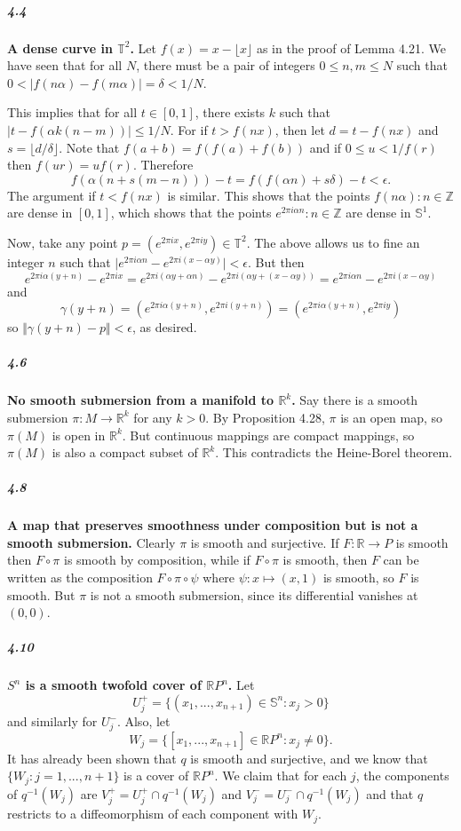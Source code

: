 \documentclass[10pt,letter]{article}
\begin{document}
\subparagraph{4.4} {\bf A dense curve in $\mathbb{T}^2$.} Let $f(x) = x - \lfloor x \rfloor$ as in the proof of Lemma 4.21. We have seen that for all $N$, there must be a pair of integers $0 \leq n,m \leq N$ such that $0 < \vert f(n\alpha) - f(m\alpha) \vert = \delta < 1/N$. 

This implies that for all $t \in [0,1]$, there exists $k$ such that $\vert t - f(\alpha k(n-m)) \vert \leq 1/N$. For if $t > f(nx)$, then let $d = t - f(nx)$ and $s = \lfloor d/\delta \rfloor$. Note that $f(a+b) = f(f(a)+f(b))$ and if $0 \leq u < 1/f(r)$ then $f(ur) = uf(r)$. Therefore
\[
f(\alpha(n + s(m-n))) - t = f(f(\alpha n) + s \delta) - t < \epsilon.
\]
The argument if $t < f(nx)$ is similar. This shows that the points $f(n\alpha): n \in \mathbb{Z}$ are dense in $[0,1]$, which shows that the points $e^{2 \pi i \alpha n}: n \in \mathbb{Z}$ are dense in $\mathbb{S}^1$.

Now, take any point $p = (e^{2 \pi i x},e^{2 \pi i y}) \in \mathbb{T}^2$. The above allows us to fine an integer $n$ such that $\vert e^{2 \pi i \alpha n} -  e^{2 \pi i (x-\alpha y)} \vert < \epsilon$. But then 
\[ e^{2\pi i \alpha(y+n)} - e^{2 \pi i x} = e^{2\pi i (\alpha y + \alpha n)} - e^{2 \pi i ( \alpha y +  (x- \alpha y))} = e^{2\pi i \alpha n} - e^{2 \pi i (x-\alpha y)}
\]
and  
\[
\gamma(y + n) = (e^{2 \pi i \alpha (y+n)}, e^{2 \pi i (y+n)}) = (e^{2 \pi i \alpha (y+n)}, e^{2 \pi i y})
\]
so $\Vert \gamma(y+n) - p \Vert < \epsilon$, as desired.


\subparagraph{4.6} {\bf No smooth submersion from a manifold to $\mathbb{R}^k$.} Say there is a smooth submersion $\pi: M \rightarrow \mathbb{R}^k$ for any $k > 0$. By Proposition 4.28, $\pi$ is an open map, so $\pi(M)$ is open in $\mathbb{R}^k$. But continuous mappings are compact mappings, so $\pi(M)$ is also a compact subset of $\mathbb{R}^k$. This contradicts the Heine-Borel theorem. 

\subparagraph{4.8} {\bf A map that preserves smoothness under composition but is not a smooth submersion.} Clearly $\pi$ is smooth and surjective. If $F: \mathbb{R} \rightarrow P$ is smooth then $F \circ \pi$ is smooth by composition, while if $F \circ \pi$ is smooth, then $F$ can be written as the composition $F \circ \pi \circ \psi$ where $\psi: x \mapsto (x,1)$ is smooth, so $F$ is smooth. But $\pi$ is not a smooth submersion, since its differential vanishes at $(0,0)$. 

\subparagraph{4.10} {\bf $S^n$ is a smooth twofold cover of $\mathbb{R}P^n$.}
Let 
\[ 
U_j^+ = \lbrace (x_1,...,x_{n+1}) \in \mathbb{S}^{n}: x_{j} > 0 \rbrace
\] 
and similarly for $U_j^-$. Also, let 
\[
W_j = \lbrace [x_1,...,x_{n+1}] \in \mathbb{R}P^n: x_j \neq 0 \rbrace.
\]
It has already been shown that $q$ is smooth and surjective, and we know that $\lbrace W_j: j=1,...,n+1 \rbrace$ is a cover of $\mathbb{R}P^n$. We claim that for each $j$, the components of $q^{-1}(W_j)$ are $V_j^+ = U_j^+ \cap q^{-1}(W_j)$ and $V_j^- = U_j^- \cap q^{-1}(W_j)$ and that $q$ restricts to a diffeomorphism of each component with $W_j$. 
\end{document}
